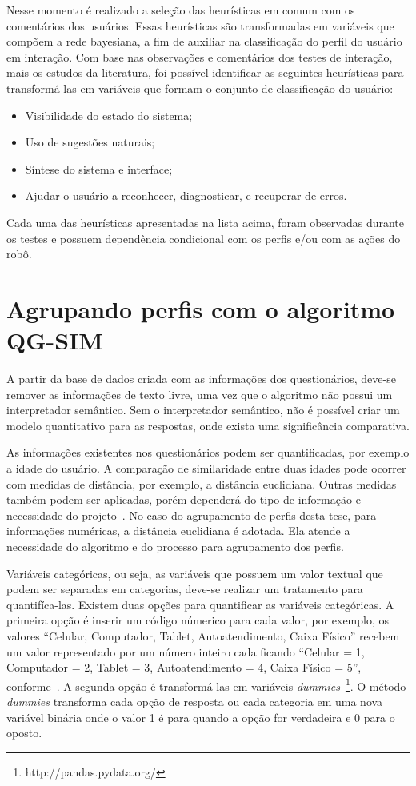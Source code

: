 Nesse momento é realizado a seleção das heurísticas em comum com os comentários dos usuários. Essas heurísticas são transformadas em variáveis que compõem a rede bayesiana, a fim de auxiliar na classificação do perfil do usuário em interação. Com base nas observações e comentários dos testes de interação, mais os estudos da literatura, foi possível identificar as seguintes heurísticas para transformá-las em variáveis que formam o conjunto de classificação do usuário:

\begin{itemize}
	\item Visibilidade do estado do sistema;
	\item Uso de sugestões naturais;
	\item Síntese do sistema e interface;
	\item Ajudar o usuário a reconhecer, diagnosticar, e recuperar de erros.
\end{itemize}

Cada uma das heurísticas apresentadas na lista acima, foram observadas durante os testes e possuem dependência condicional com os perfis e/ou com as ações do robô.

\section{Agrupando perfis com o algoritmo QG-SIM}
\label{sec:preparacao}
A partir da base de dados criada com as informações dos questionários, deve-se remover as informações de texto livre, uma vez que o algoritmo não possui um interpretador semântico. Sem o interpretador semântico, não é possível criar um modelo quantitativo para as respostas, onde exista uma significância comparativa.

As informações existentes nos questionários podem ser quantificadas, por exemplo a idade do usuário. A comparação de similaridade entre duas idades pode ocorrer com medidas de distância, por exemplo, a distância euclidiana. Outras medidas também podem ser aplicadas, porém dependerá do tipo de informação e necessidade do projeto~\cite{masiero:2013}. No caso do agrupamento de perfis desta tese, para informações numéricas, a distância euclidiana é adotada. Ela atende a necessidade do algoritmo e do processo para agrupamento dos perfis.

Variáveis categóricas, ou seja, as variáveis que possuem um valor textual que podem ser separadas em categorias, deve-se realizar um tratamento para quantifíca-las. Existem duas opções para quantificar as variáveis categóricas. A primeira opção é inserir um código númerico para cada valor, por exemplo, os valores ``Celular, Computador, Tablet, Autoatendimento, Caixa Físico'' recebem um valor representado por um número inteiro cada ficando ``Celular = 1, Computador = 2, Tablet = 3, Autoatendimento = 4, Caixa Físico = 5'', conforme~. A segunda opção é transformá-las em variáveis \emph{dummies}~\footnote{http://pandas.pydata.org/}. O método \emph{dummies} transforma cada opção de resposta ou cada categoria em uma nova variável binária onde o valor 1 é para quando a opção for verdadeira e 0 para o oposto.

